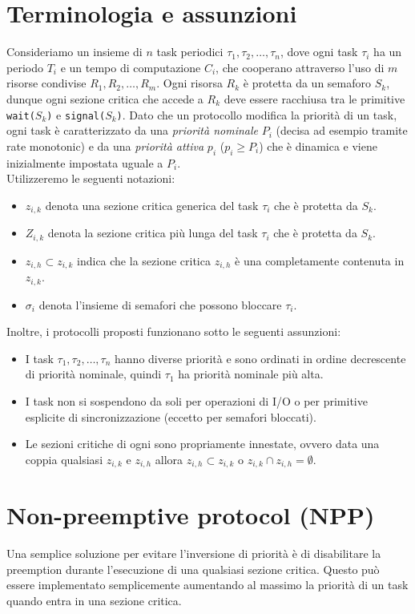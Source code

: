 \documentclass[12pt,openany,onesided]{book}
\begin{document}
\section{Terminologia e assunzioni}
Consideriamo un insieme di $n$ task periodici $\tau_1,\tau_2,\dots,\tau_n$, dove ogni task $\tau_i$ ha un periodo $T_i$ e un tempo di computazione $C_i$, che cooperano
attraverso l'uso di $m$ risorse condivise $R_1,R_2,\dots,R_m$.
Ogni risorsa $R_k$ è protetta da un semaforo $S_k$, dunque ogni sezione critica che accede a $R_k$ deve essere racchiusa tra le primitive \texttt{wait($S_k$)} e \texttt{signal($S_k$)}.
Dato che un protocollo modifica la priorità di un task, ogni task è caratterizzato da una \textit{priorità nominale} $P_i$ (decisa ad esempio tramite rate monotonic)
e da una \textit{priorità attiva} $p_i$ ($p_i \geq P_i$) che è dinamica e viene inizialmente impostata uguale a $P_i$.
\\
Utilizzeremo le seguenti notazioni:
\begin{itemize}
    \item $z_{i,k}$ denota una sezione critica generica del task $\tau_i$ che è protetta da $S_k$.
    \item $Z_{i,k}$ denota la sezione critica più lunga del task $\tau_i$ che è protetta da $S_k$.
    \item $z_{i,h}\subset z_{i,k}$ indica che la sezione critica $z_{i,h}$ è una completamente contenuta in $z_{i,k}$.
    \item $\sigma_i$ denota l'insieme di semafori che possono bloccare $\tau_i$.
\end{itemize}
Inoltre, i protocolli proposti funzionano sotto le seguenti assunzioni:
\begin{itemize}
    \item I task $\tau_1,\tau_2,\dots,\tau_n$ hanno diverse priorità e sono ordinati in ordine decrescente di priorità nominale, quindi $\tau_1$ ha priorità nominale più alta.
    \item I task non si sospendono da soli per operazioni di I/O o per primitive esplicite di sincronizzazione (eccetto per semafori bloccati).
    \item Le sezioni critiche di ogni sono propriamente innestate, ovvero data una coppia qualsiasi $z_{i,k}$ e $z_{i,h}$ allora $z_{i,h}\subset z_{i,k}$ o $z_{i,k}\cap z_{i,h}=\emptyset$.
\end{itemize}
\section{Non-preemptive protocol (NPP)}
Una semplice soluzione per evitare l'inversione di priorità è di disabilitare la preemption durante l'esecuzione di una qualsiasi sezione critica.
Questo può essere implementato semplicemente aumentando al massimo la priorità di un task quando entra in una sezione critica.
\end{document}
